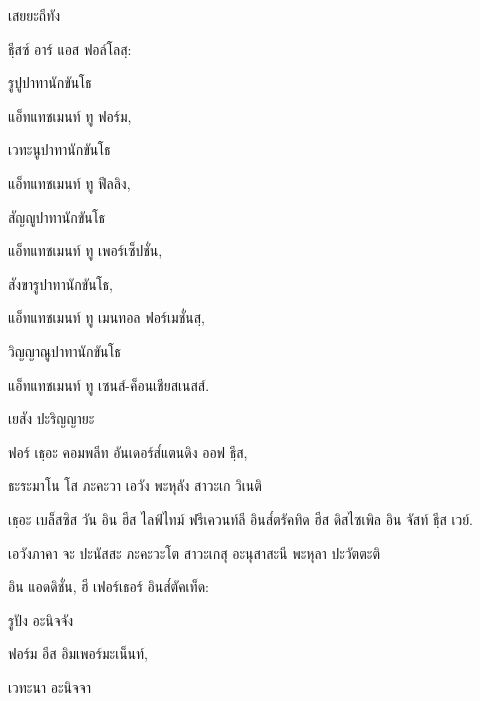 เสยยะถีทัง

\begin{english}
ธฺีสซ์ อาร์ แอส ฟอล์โลสฺ:
\end{english}

รูปูปาทานักขันโธ

\begin{english}
แอ็ทแทชเมนท์ ทู ฟอร์ม,
\end{english}

เวทะนูปาทานักขันโธ

\begin{english}
แอ็ทแทชเมนท์ ทู ฟีลลิง,
\end{english}

สัญญูปาทานักขันโธ

\begin{english}
แอ็ทแทชเมนท์ ทู เพอร์เซ็ปชั่น,
\end{english}

สังขารูปาทานักขันโธ,

\begin{english}
แอ็ทแทชเมนท์ ทู เมนทอล ฟอร์เมชั่นสฺ,
\end{english}

วิญญาณูปาทานักขันโธ

\begin{english}
แอ็ทแทชเมนท์ ทู เซนส์-ค็อนเชียสเนสส์.
\end{english}

เยสัง ปะริญญายะ

\begin{english}
ฟอร์ เธฺอะ คอมพลีท อันเดอร์ส๎แตนดิง ออฟ ธฺีส,​
\end{english}

ธะระมาโน โส ภะคะวา เอวัง พะหุลัง สาวะเก วิเนติ

\begin{english}
เธฺอะ เบล็สซิส วัน อิน ฮีส ไลฟ์ไทม์ ฟรีเควนท์ลี อินส๎ตรัคทิด ฮีส ดิสไซเพิล อิน จัสท์ ธฺีส เวย์.
\end{english}

เอวังภาคา จะ ปะนัสสะ ภะคะวะโต สาวะเกสุ อะนุสาสะนี พะหุลา ปะวัตตะติ

\begin{english}
อิน แอดดิชั่น, ฮี เฟอร์เธอร์ อินส๎ตัคเท็ด:
\end{english}

รูปัง อะนิจจัง

\begin{english}
ฟอร์ม อีส อิมเพอร์มะเน็นท์,
\end{english}

เวทะนา อะนิจจา

